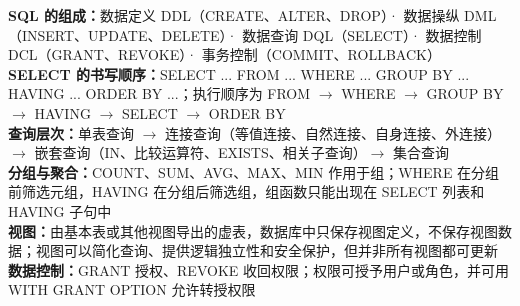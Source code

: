 \documentclass[a4paper,11pt]{article}
\begin{document}

\begin{knowmap}
\textbf{SQL 的组成：}数据定义 DDL（CREATE、ALTER、DROP）· 数据操纵 DML（INSERT、UPDATE、DELETE）· 数据查询 DQL（SELECT）· 数据控制 DCL（GRANT、REVOKE）· 事务控制（COMMIT、ROLLBACK）\\[2pt]
\textbf{SELECT 的书写顺序：}SELECT ... FROM ... WHERE ... GROUP BY ... HAVING ... ORDER BY ...；执行顺序为 FROM $\rightarrow$ WHERE $\rightarrow$ GROUP BY $\rightarrow$ HAVING $\rightarrow$ SELECT $\rightarrow$ ORDER BY\\[2pt]
\textbf{查询层次：}单表查询 $\rightarrow$ 连接查询（等值连接、自然连接、自身连接、外连接）$\rightarrow$ 嵌套查询（IN、比较运算符、EXISTS、相关子查询）$\rightarrow$ 集合查询\\[2pt]
\textbf{分组与聚合：}COUNT、SUM、AVG、MAX、MIN 作用于组；WHERE 在分组前筛选元组，HAVING 在分组后筛选组，组函数只能出现在 SELECT 列表和 HAVING 子句中\\[2pt]
\textbf{视图：}由基本表或其他视图导出的虚表，数据库中只保存视图定义，不保存视图数据；视图可以简化查询、提供逻辑独立性和安全保护，但并非所有视图都可更新\\[2pt]
\textbf{数据控制：}GRANT 授权、REVOKE 收回权限；权限可授予用户或角色，并可用 WITH GRANT OPTION 允许转授权限
\end{knowmap}
\end{document}
